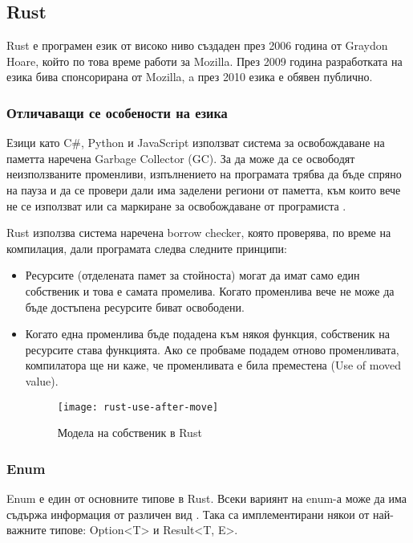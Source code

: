 \subsection{Rust}
Rust е програмен език от високо ниво създаден през 2006 година от Graydon
Hoare, който по това време работи за Mozilla. През 2009 година разработката на
езика бива спонсорирана от Mozilla, a през 2010 езика е обявен публично.
\cite{Rust_Origins_Wikipedia}

\subsubsection{Отличаващи се особености на езика}

Езици като C\#, Python и JavaScript използват система за освобождаване на паметта
наречена Garbage Collector (GC). За да може да се освободят неизползваните
променливи, изпълнението на програмата трябва да бъде спряно на пауза и да се
провери дали има заделени региони от паметта, към които вече не се използват
или са маркиране за освобождаване от програмиста \cite{Garbage_Collection_Wikipedia}.

Rust използва система наречена borrow checker, която проверява, по време на
компилация, дали програмата следва следните принципи:

\begin{itemize}

\item Ресурсите (отделената памет за стойноста) могат да имат само един
собственик и това е самата промелива. Когато променлива вече не може да бъде
достъпена ресурсите биват освободени.

\item Когато една променлива бъде подадена към някоя функция, собственик на
ресурсите става функцията. Ако се пробваме подадем отново променливата,
компилатора ще ни каже, че променливата е била преместена (Use of moved value).
\begin{figure}[!htb]
  \texttt{[image: rust-use-after-move]}
  \centering
  \caption{Модела на собственик в Rust}
  \label{fig:rust-use-after-move}
\end{figure}

\end{itemize}

\subsubsection{Enum}
Enum е един от основните типове в Rust. Всеки вариянт на enum-а може да има
съдържа информация от различен вид \cite{Rust_Enums}. Така са имплементирани
някои от най-важните типове: Option<T> и Result<T, E>.

